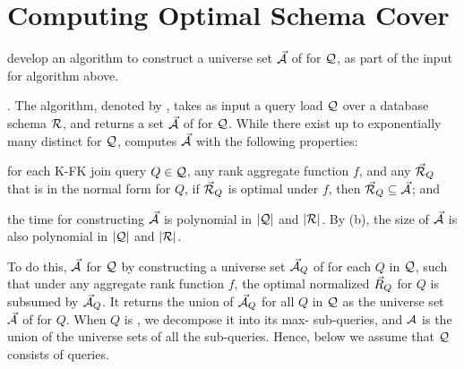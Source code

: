\vspace{-0.3ex}
\section{Computing Optimal Schema Cover}
\label{sec-cover}
\vspace{-0.4ex}

 develop an algorithm to construct a universe set
$\vec{{\mathcal A}}$ of \bss for $\mathcal Q$, as part of the input for algorithm
\opts above. %

. The algorithm, denoted by \usc, takes as input a
query load $\mathcal Q$
over a database schema ${\mathcal R}$, and returns a set $\vec{{\mathcal A}}$ of \bss
for $\mathcal Q$.
While there exist up to exponentially many distinct \bss for
$\mathcal Q$, \usc computes $\vec{{\mathcal A}}$ with the following properties:
\mbi
\item[(a)] for each K-FK join \SPC query $Q\in \mathcal Q$, any rank aggregate function $f$,
  and any \bds $\vec{{\mathcal R}}_{Q}$ that is in the normal form for $Q$,
  if $\vec{{\mathcal R}}_{Q}$ is optimal under $f$, then
  $\vec{{\mathcal R}}_{Q}\subseteq \vec{{\mathcal A}}$; and
\item[(b)] the time for constructing $\vec{{\mathcal A}}$ is polynomial in
  $|\mathcal Q|$ and $|{\mathcal R}|$.
\mei
\vspace{-0.4ex}
By (b), the size of $\vec{{\mathcal A}}$ is also polynomial in
$|\mathcal Q|$ and $|{\mathcal R}|$.

\vspace{0.36ex}
To do this,  %
$\vec{{\mathcal A}}$ for $\mathcal Q$ by
constructing a universe set $\vec{{\mathcal A}}_{Q}$ of \bss for each
$Q$ in $\mathcal Q$,
such that under any aggregate rank function $f$, the optimal
normalized \bds $\vec{R}_{Q}$ for $Q$ is %
subsumed by $\vec{{\mathcal A}}_{Q}$.
It returns the union of $\vec{{\mathcal A}}_{Q}$ for all $Q$ in $\mathcal Q$ as
the universe set $\vec{{\mathcal A}}$ of \bss for $Q$.
%
When $Q$ is , we decompose it into its max-\SPC
sub-queries, and ${\mathsf{{\mathcal A}}}$ is the union of the universe sets of
  all the sub-queries. 
Hence, below we assume that $\mathcal Q$ consists of \SPC queries.



